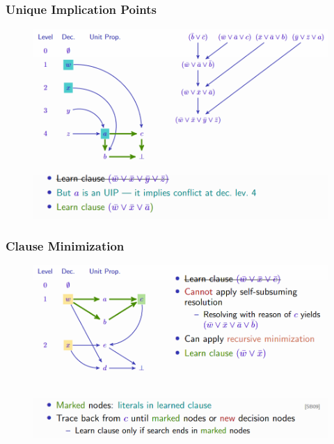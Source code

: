 \documentclass[10pt,a4paper]{report}
\begin{document}
\subsubsection{Unique Implication Points}
\begin{figure}[H]
    \centering
    \includegraphics[scale=0.5]{7.png}
\end{figure}
\subsubsection{Clause Minimization}
\begin{figure}[H]
    \centering
    \includegraphics[scale=0.5]{8.png}
\end{figure}
\end{document}
